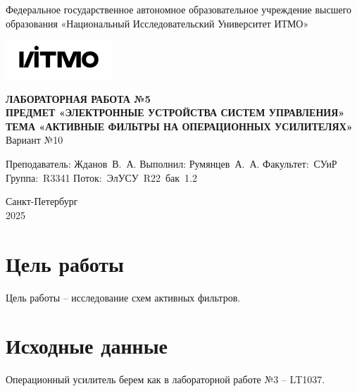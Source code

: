 \documentclass[a4paper, 12pt]{article}
\begin{document}
    \begin{titlepage}

        \begin{center}
        Федеральное государственное автономное образовательное учреждение высшего образования
        «Национальный Исследовательский Университет ИТМО»
        \vfill
        
        \includegraphics[width=0.3\textwidth]{itmo.png} %

        {\large\bf ЛАБОРАТОРНАЯ РАБОТА №5}\\
        {\large\bf ПРЕДМЕТ «ЭЛЕКТРОННЫЕ УСТРОЙСТВА СИСТЕМ УПРАВЛЕНИЯ»}\\
        {\large\bf ТЕМА «АКТИВНЫЕ ФИЛЬТРЫ НА ОПЕРАЦИОННЫХ УСИЛИТЕЛЯХ»}\\
        Вариант №10
        \vfill

        \begin{flushright}
            \begin{minipage}{.45\textwidth}
            {
                \hbox{Преподаватель:}
                \hbox{Жданов В. А.}
                \hbox{}
                \hbox{Выполнил:}
                \hbox{Румянцев А. А.}
                \hbox{}
                \hbox{Факультет: СУиР}
                \hbox{Группа: R3341}
                \hbox{Поток: ЭлУСУ R22 бак 1.2}
            }
            \end{minipage}
        \end{flushright}
        \vfill
  
        Санкт-Петербург\\
        2025
        \end{center}
    \end{titlepage}
    
    \tableofcontents

    \newpage
    \section{Цель работы}
    Цель работы -- исследование схем активных фильтров.


    \section{Исходные данные}
    Операционный усилитель берем как в лабораторной работе №3 -- LT1037.
\end{document}
